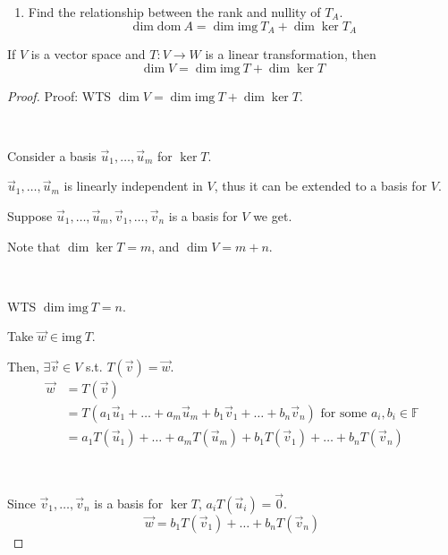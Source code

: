 \documentclass[11pt,fleqn]{book} %
\begin{document}
\begin{example}
\begin{enumerate}
        \item Find the relationship between the rank and nullity of $T_A$. 
        $$\dim \mathrm{dom}~A = \dim \mathrm{img}~T_A + \dim \ker  T_A $$
    \end{enumerate}
\end{example}

\setcounter{section}{3}
\setcounter{dummy}{16}
\begin{theorem}
    If $V$ is a  vector space and $T: V \to W$ is a linear transformation, then $$\dim V = \dim \mathrm{img}~T + \dim \ker T$$
\end{theorem}
\setcounter{section}{2}

\begin{proof}
    Proof: WTS $\dim V = \dim \mathrm{img}~T + \dim \ker T$. 

    {~~~}
    
    Consider a basis $\vec{u}_1, \dots, \vec{u}_m$ for $\ker T$. 
    
    $\vec{u}_1, \dots, \vec{u}_m$ is linearly independent in $V$, thus it can be extended to a basis for $V$. 
    
    Suppose $\vec{u}_1, \dots, \vec{u}_m, \vec{v}_1, \dots, \vec{v}_n$ is a basis for $V$ we get. 

    Note that $\dim \ker T = m$, and $\dim V = m + n$. 
    
    {~~~}

    WTS $\dim \mathrm{img}~T = n$. 
    
    Take $\vec{w} \in \mathrm{img}~T$. 
    
    Then, $\exists \vec{v} \in V$ s.t. $T(\vec{v}) = \vec{w}$. 
    \begin{align*}  
        \vec{w}
        &=T(\vec{v})
        \\
        &= T(a_1\vec{u}_1 + \dots + a_m\vec{u}_m + b_1\vec{v}_1 + \dots + b_n\vec{v}_n)
        \text{ for some }a_i, b_i \in \mathbb{F}
        \\
        &= a_1T(\vec{u}_1) + \dots + a_mT(\vec{u}_m) + b_1T(\vec{v}_1) + \dots + b_nT(\vec{v}_n)
    \end{align*}
    
    {~~~}

    Since $\vec{v}_1, \dots, \vec{v}_n$ is a basis for $\ker T$, $a_iT(\vec{u}_i) = \vec{0}$. 
    $$\vec{w} = b_1T(\vec{v}_1) + \dots + b_nT(\vec{v}_n)$$


\end{proof}
\end{document}
